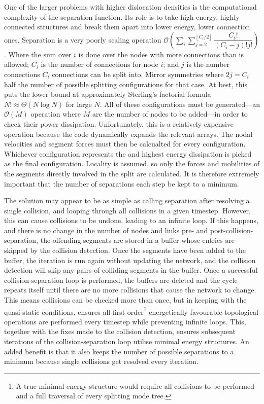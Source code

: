 One of the larger problems with higher dislocation densities is the computational complexity of the separation function. Its role is to take high energy, highly connected structures and break them apart into lower energy, lower connection ones. Separation is a very poorly scaling operation $\mathcal{O}\left(\sum\limits_{i}\sum\limits_{j=2}^{\left\lfloor C_i/2 \right\rfloor} \dfrac{C_i!}{(C_i-j)! j!}\right)$. Where the sum over $i$ is done over the nodes with more connections than is allowed; $C_i$ is the number of connections for node $i$; and $j$ is the number connections $C_i$ connections can be split into. Mirror symmetries where $2j = C_i$ half the number of possible splitting configurations for that case. At best, this puts the lower bound at approximately Sterling's factorial formula $N! \approx \mathcal{\Theta}(N\log{N})$ for large $N$. All of these configurations must be generated---an $\mathcal{O}(M)$ operation where $M$ are the number of nodes to be added---in order to check their power dissipation. Unfortunately, this is a relatively expensive operation because the code dynamically expands the relevant arrays. The nodal velocities and segment forces must then be calcualted for every configuration. Whichever configuration represents the and highest energy dissipation is picked as the final configuration. Locality is assumed, so only the forces and mobilities of the segments directly involved in the split are calculated. It is therefore extremely important that the number of separations each step be kept to a minimum.

The solution may appear to be as simple as calling separation after resolving a single collision, and looping through all collisions in a given timestep. However, this can cause collisions to be undone, leading to an infinite loop. If this happens, and there is no change in the number of nodes and links pre- and post-collision-separation, the offending segments are stored in a buffer whose entries are skipped by the collision detection. Once the segments have been added to the buffer, the iteration is run again without updating the network, and the collision detection will skip any pairs of colliding segments in the buffer. Once a successful collision-separation loop is performed, the buffers are deleted and the cycle repeats itself until there are no more collisions that cause the network to change. This means collisions can be checked more than once, but in keeping with the quasi-static conditions, ensures all first-order\footnote{A true minimal energy structure would require all collisions to be performed and a full traversal of every splitting mode tree.} energetically favourable topological operations are performed every timestep while preventing infinite loops. This, together with the fixes made to the collision detection, ensures subsequent iterations of the collision-separation loop utilise minimal energy structures. An added benefit is that it also keeps the number of possible separations to a minimum because single collisions get resolved every iteration.

